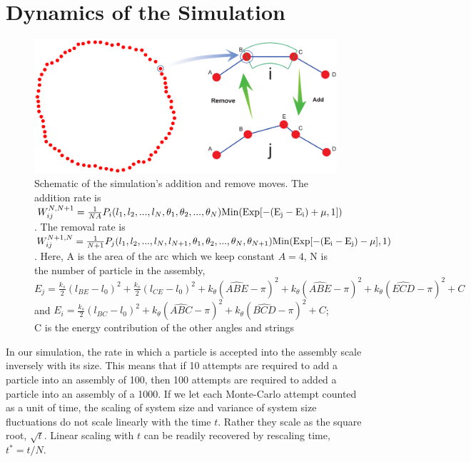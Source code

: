 \documentclass[amsmath,preprintnumbers,10pt,nofootinbib,prl,twocolumn]{revtex4-1}
\begin{document}
\section{Dynamics of the Simulation}
\begin{figure}[tbp]
\includegraphics[width=1\linewidth,angle=0]{AddingMoveSchematicFig1.pdf}
\caption{ Schematic of the simulation's addition and remove moves. The addition rate is $W_{ij}^{N,N+1}=\frac{1}{NA} P_i(l_1,l_2,...,l_N,\theta_1,\theta_2,...,\theta_N)\rm{Min}(\rm{Exp}[-(E_j-E_i) +\mu,1])$. The removal rate is $W_{ij}^{N+1,N}=\frac{1}{N+1}P_j(l_1,l_2,...,l_N,l_{N+1},\theta_1,\theta_2,...,\theta_N,\theta_{N+1})\rm{Min}(\rm{Exp}[-(E_i-E_j) -\mu],1)$. Here, A is the area of the arc which we keep constant $A=4$, N is the number of particle in the assembly, $E_j = \frac{k_s}{2}(l_{BE}-l_0)^2+\frac{k_s}{2}(l_{CE}-l_0)^2+k_\theta(\widehat{ABE}-\pi)^2+k_\theta(\widehat{ABE}-\pi)^2+k_\theta(\widehat{ECD}-\pi)^2+C$ and $E_i=\frac{k_s}{2}(l_{BC}-l_0)^2+k_\theta(\widehat{ABC}-\pi)^2+k_\theta(\widehat{BCD}-\pi)^2+C$; C is the energy contribution of the other angles and strings }
\label{fig:SimulationSchematic}
\end{figure}
In our simulation, the rate in which a particle is accepted into the assembly scale inversely with its size. This means that if 10 attempts are required to add a particle into an assembly of 100, then 100 attempts are required to added a particle into an assembly of a 1000. If we let each Monte-Carlo attempt counted as a unit of time, the scaling of system size and variance of system size fluctuations do not scale linearly with the time $t$. Rather they scale as the square root, $\sqrt{t}$. Linear scaling with $t$ can be readily recovered by rescaling time, $t^*=t/N$.
\end{document}
